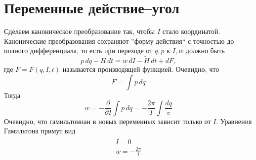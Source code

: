 \documentclass{article}
\begin{document}
\section{Переменные действие--угол}
Сделаем каноническое преобразование так, чтобы $I$ стало координатой. Канонические 
преобразования сохраняют ''форму действия`` с точностью до полного дифференциала, то 
есть при переходе от $q,p$ к $I,w$ должно быть
\begin{equation}
    p\,dq - H\,dt = w\,dI - \tilde{H}\,dt + dF,
\end{equation}
где $F = F(q,I,t)$ называется производящей функцией. Очевидно, что
\begin{equation}
    F = \int p\,dq
\end{equation}
Тогда 
\begin{equation}
    w = -\frac{\partial}{\partial I} \int p\,dq = -\frac{2\pi}{T} \int \frac{dq}{v}
\end{equation}
Очевидно, что гамильтониан в новых переменных зависит только от $I$. Уравнения Гамильтона 
примут вид
\begin{equation}
    \begin{gathered}
        \dot{I} = 0 \\
        \dot{w} = -\frac{2\pi}{T}
    \end{gathered}
\end{equation}
\end{document}
